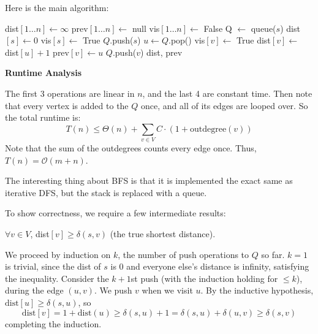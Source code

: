 \begin{algothm} 
    Here is the main algorithm:
    \begin{algorithmic}
            \State dist$[1\dots n] \gets \infty$
            \State prev$[1\dots n] \gets$ null
            \State vis$[1\dots n] \gets$ False
            \State Q $\gets$ queue($s$)
            \State dist$[s] \gets 0$
            \State vis$[s] \gets$ True
            \State $Q$.push($s$)
                \State $u \gets Q$.pop()
                        \State vis$[v] \gets$ True
                        \State dist$[v] \gets$ dist$[u] + 1$
                        \State prev$[v] \gets u$
                        \State $Q$.push($v$)
                    \EndIf
                \EndFor
            \EndWhile
            \State \Return dist, prev
        \EndFunction
    \end{algorithmic}

    \textbf{Runtime Analysis}
    \begin{proof*}
        The first 3 operations are linear in $n$, and the last 4 are constant time. Then note that every vertex is added to the $Q$ once, and all of its edges are looped over.
        So the total runtime is:
        \[ T(n) \leq \Theta(n) + \sum_{v \in V} C \cdot (1 + \text{outdegree}(v)) \]
        Note that the sum of the outdegrees counts every edge once. Thus, $T(n) = \mathcal{O}(m + n)$.
    \end{proof*}

\end{algothm}

The interesting thing about BFS is that it is implemented the exact same as iterative DFS, but the stack is replaced with a queue.

To show correctness, we require a few intermediate results: 
\begin{theorem} 
    $\forall v \in V$, dist$[v] \geq \delta(s, v)$ (the true shortest distance).

    \begin{proof*}
        We proceed by induction on $k$, the number of push operations to $Q$ so far. $k = 1$ is trivial, since the dist of $s$ is 0 and everyone else's
        distance is infinity, satisfying the inequality. Consider the $k + 1$st push (with the induction holding for $\leq k$), during the edge $(u, v)$. We push $v$ when we visit $u$.
        By the inductive hypothesis, $\text{dist}[u] \geq \delta(s, u)$, so 
        \[ \text{dist}[v] = 1 + \text{dist}(u) \geq \delta(s, u) + 1 = \delta(s, u) + \delta(u, v) \geq \delta(s, v) \]
        completing the induction.
    \end{proof*}
\end{theorem}

